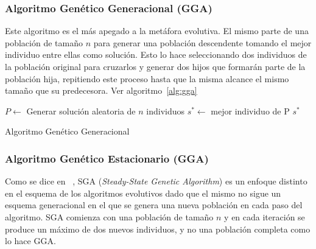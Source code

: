 \documentclass{ci5652}
\begin{document}
\subsubsection{Algoritmo Genético Generacional (GGA)}

Este algoritmo es el más apegado a la metáfora evolutiva. El mismo parte de una población de tamaño $n$ para generar una población descendente tomando el mejor individuo entre ellas como solución. Esto lo hace seleccionando dos individuos de la población original para cruzarlos y generar dos hijos que formarán parte de la población hija, repitiendo este proceso hasta que la misma alcance el mismo tamaño que su predecesora. Ver algoritmo~\ref{alg:gga}


\begin{algorithm}[!h]
    \DontPrintSemicolon
    \vspace*{0.1cm}

	$P \leftarrow $ Generar solución aleatoria de $n$ individuos\;
	$s^{*} \leftarrow $ mejor individuo de P\;
	\Return $s^{*}$    
    \vspace*{0.1cm}
    \caption{Algoritmo Genético Generacional}
    \label{alg:gga}
\end{algorithm}
  
\subsubsection{Algoritmo Genético Estacionario (GGA)}

Como se dice en ~\cite{whitley1988genitor}, SGA (\textit{Steady-State Genetic Algorithm}) es un enfoque distinto en el esquema de los algoritmos evolutivos dado que el mismo no sigue un esquema generacional en el que se genera una nueva población en cada paso del algoritmo. SGA comienza con una población de tamaño $n$ y en cada iteración se produce un máximo de dos nuevos individuos, y no una población completa como lo hace GGA.
\end{document}
